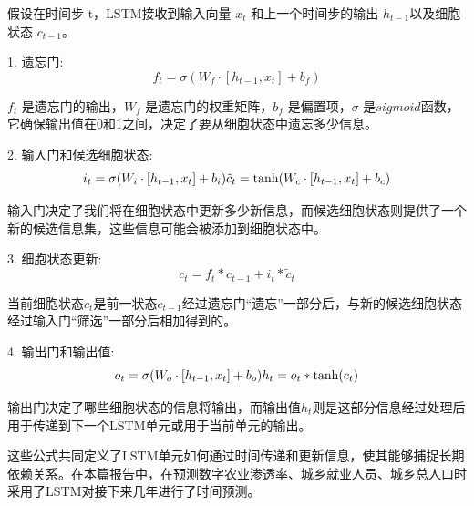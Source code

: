 假设在时间步 t，LSTM接收到输入向量 $x_t$ 和上一个时间步的输出 $h_{t-1}$以及细胞状态 $c_{t-1}$。

1. 
遗忘门:
\begin{equation}
f_t = \sigma(W_f \cdot [h_{t-1}, x_t] + b_f)
\end{equation}

$f_t$ 是遗忘门的输出，$W_f$ 是遗忘门的权重矩阵，$b_f$ 是偏置项，$\sigma$ 是$sigmoid$函数，它确保输出值在0和1之间，决定了要从细胞状态中遗忘多少信息。

2. 
输入门和候选细胞状态:
\begin{equation}
i_t = \sigma(W_i \cdot [h_{t-1}, x_t] + b_i)
\\
\tilde{c}_t = \tanh(W_c \cdot [h_{t-1}, x_t] + b_c)
\end{equation}

输入门决定了我们将在细胞状态中更新多少新信息，而候选细胞状态则提供了一个新的候选信息集，这些信息可能会被添加到细胞状态中。

3. 
细胞状态更新:
\begin{equation}
c_t = f_t * c_{t-1} + i_t * \tilde{c}_t
\end{equation}


当前细胞状态$c_t$是前一状态$c_{t-1}$经过遗忘门“遗忘”一部分后，与新的候选细胞状态经过输入门“筛选”一部分后相加得到的。

4. 
输出门和输出值: 
\begin{equation}
o_t = \sigma(W_o \cdot [h_{t-1}, x_t] + b_o)
\\
h_t = o_t * \tanh(c_t)
\end{equation}

输出门决定了哪些细胞状态的信息将输出，而输出值$h_t$则是这部分信息经过处理后用于传递到下一个LSTM单元或用于当前单元的输出。

这些公式共同定义了LSTM单元如何通过时间传递和更新信息，使其能够捕捉长期依赖关系。在本篇报告中，在预测数字农业渗透率、城乡就业人员、城乡总人口时采用了LSTM对接下来几年进行了时间预测。

